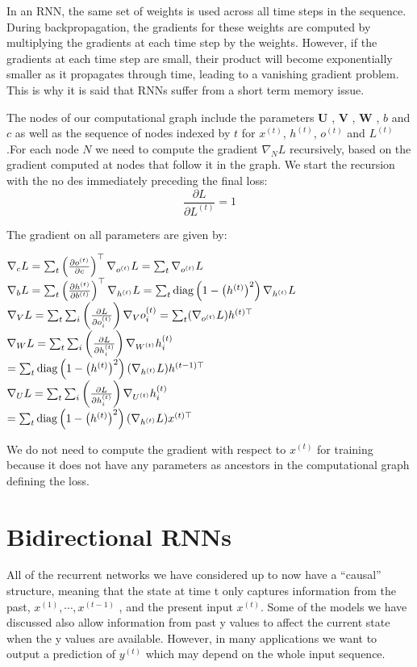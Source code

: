 \documentclass{report}
\begin{document}
In an RNN, the same set of weights is used across all time steps in the sequence. During backpropagation, the gradients for these weights are computed by multiplying the gradients at each time step by the weights. However, if the gradients at each time step are small, their product will become exponentially smaller as it propagates through time, leading to a vanishing gradient problem. This is why it is said that RNNs suffer from a short term memory issue.

The nodes of our computational graph include the parameters $\mathbf U$ , $\mathbf V$ , $\mathbf W$ , $b$ and $c$ as well as the sequence of nodes indexed by $t$ for $x^{(t)}$, $h^{(t)}$, $o^{(t)}$ and $L^{(t)}$.For each node $N$ we need to compute the gradient $\nabla_N{L}$ recursively, based on the gradient computed at nodes that follow it in the graph. We start the recursion with the no des immediately preceding the final loss:
$$\frac{\partial L}{\partial{ L^{(t)}}} = 1$$

The gradient on all parameters are given by:

$	\nabla_c L = \sum_t \left(\frac{\partial o^{(t)}}{\partial c}\right)^\top \nabla_{o^{(t)}} L = \sum_t \nabla_{o^{(t)}} L$ \\
$	\nabla_b L = \sum_t \left(\frac{\partial h^{(t)}}{\partial b^{(t)}}\right)^\top \nabla_{h^{(t)}}L = \sum_t \text{diag}\left(1-\left(h^{(t)}\right)^2\right) \nabla_{h^{(t)}} L$ \\
	$\nabla_V L = \sum_t \sum_i \left(\frac{\partial L}{\partial o_i^{(t)}}\right) \nabla_{V}o_i^{(t)} = \sum_t (\nabla_{o^{(t)}} L) h^{(t)\top}$ \\
	$\nabla_W L = \sum_t \sum_i \left(\frac{\partial L}{\partial h_i^{(t)}}\right) \nabla_{W^{(t)}}h_i^{(t)}$ \\
	$= \sum_t \text{diag}\left(1-\left(h^{(t)}\right)^2\right)(\nabla_{h^{(t)}}L)h^{(t-1)\top}$ \\
	$\nabla_U L = \sum_t \sum_i \left(\frac{\partial L}{\partial h_i^{(t)}}\right) \nabla_{U^{(t)}}h_i^{(t)}$ \\
	$ = \sum_t \text{diag}\left(1-\left(h^{(t)}\right)^2\right)(\nabla_{h^{(t)}}L)x^{(t)\top}$ 
 
	We do not need to compute the gradient with respect to $x^{(t)}$ for training because it does not have any parameters as ancestors in the computational graph defining the loss.

\section{Bidirectional RNNs}
All of the recurrent networks we have considered up to now have a “causal” structure, meaning that the state at time t only captures information from the past, $x^{(1)},\cdots,x^{(t-1)}$ , and the present input $x^{(t)}$. Some of the models we have discussed also allow information from past y values to affect the current state when the y values are available. However, in many applications we want to output a prediction of $y^{(t)}$ which may depend on the whole input sequence.
\end{document}

